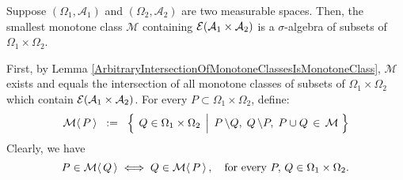 \begin{lemma}\label{MIsASigmaAlgebra}
\mbox{}\vskip0.1cm\noindent
Suppose
$\left(\Omega_{1},\mathcal{A}_{1}\right)$ and $\left(\Omega_{2},\mathcal{A}_{2}\right)$
are two measurable spaces.
\vskip 0.1cm
\noindent
Then, the smallest monotone class $\mathcal{M}$ containing
$\mathcal{E}\!\left(\mathcal{A}_{1}\times\mathcal{A}_{2}\right)$
is a $\sigma$-algebra of subsets of \,$\Omega_{1} \times \Omega_{2}$.
\end{lemma}
\proof
First, by Lemma \ref{ArbitraryIntersectionOfMonotoneClassesIsMonotoneClass},
$\mathcal{M}$ exists and equals the intersection of all monotone classes of subsets
of $\Omega_{1}\times\Omega_{2}$ which contain
$\mathcal{E}\!\left(\mathcal{A}_{1}\times\mathcal{A}_{2}\right)$.
For every $P \subset \Omega_{1}\times\Omega_{2}$, define:
\begin{equation*}
\mathcal{M}\!\left\langle\,P\,\right\rangle
	\;\; := \;\;
	\left\{\;
		\left.
		Q \overset{{\color{white}.}}{\in} \Omega_{1}\times\Omega_{2}
		\,\;\right\vert\;
		P\,\backslash Q,\; Q\,\backslash P,\; P\cup Q \,\in\, \mathcal{M}
	\;\right\}
\end{equation*}
Clearly, we have
\begin{equation*}
P \in \mathcal{M}\!\left\langle\,Q\,\right\rangle
\;\Longleftrightarrow\;
Q \in \mathcal{M}\!\left\langle\,P\,\right\rangle,
\quad
\textnormal{for every $P,\, Q \in \Omega_{1}\times\Omega_{2}$}.
\end{equation*}


